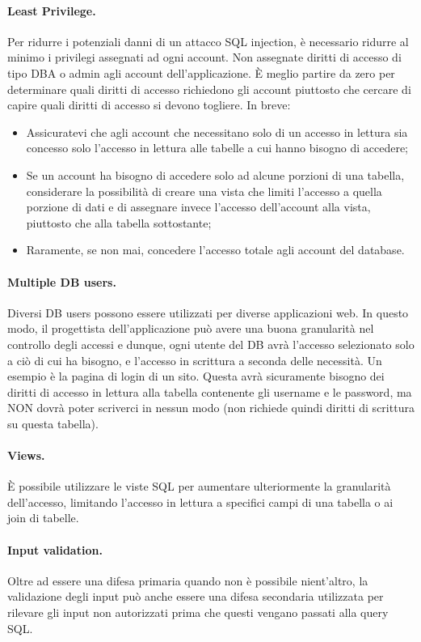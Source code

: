 \paragraph{Least Privilege.}
Per ridurre i potenziali danni di un attacco SQL injection, è necessario ridurre al minimo i privilegi assegnati ad ogni account. Non assegnate diritti di accesso di tipo DBA o admin agli account dell'applicazione. È meglio partire da zero per determinare quali diritti di accesso richiedono gli account piuttosto che cercare di capire quali diritti di accesso si devono togliere. In breve:

\begin{itemize}
    \item Assicuratevi che agli account che necessitano solo di un accesso in lettura sia concesso solo l'accesso in lettura alle tabelle a cui hanno bisogno di accedere;
    \item Se un account ha bisogno di accedere solo ad alcune porzioni di una tabella, considerare la possibilità di creare una vista che limiti l'accesso a quella porzione di dati e di assegnare invece l'accesso dell'account alla vista, piuttosto che alla tabella sottostante;
    \item Raramente, se non mai, concedere l'accesso totale agli account del database.
\end{itemize}

\paragraph{Multiple DB users.}
Diversi DB users possono essere utilizzati per diverse applicazioni web.
In questo modo, il progettista dell'applicazione può avere una buona granularità
nel controllo degli accessi e dunque,
ogni utente del DB avrà l'accesso selezionato solo a ciò di cui ha bisogno, e
l'accesso in scrittura a seconda delle necessità. Un esempio è la pagina di login
di un sito. Questa avrà sicuramente bisogno dei diritti di accesso in lettura alla
tabella contenente gli username e le password, ma NON dovrà poter scriverci in
nessun modo (non richiede quindi diritti di scrittura su questa tabella).

\paragraph{Views.}
È possibile utilizzare le viste SQL per aumentare ulteriormente la granularità
dell'accesso, limitando l'accesso in lettura a specifici campi di una tabella o
ai join di tabelle.

\paragraph{Input validation.}
Oltre ad essere una difesa primaria quando non è possibile nient'altro,
la validazione degli
input può anche essere una difesa secondaria utilizzata per rilevare gli input
non autorizzati
prima che questi vengano passati alla query SQL.